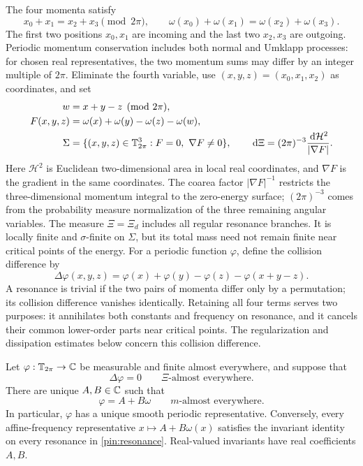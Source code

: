 The four momenta satisfy
\begin{equation}
 x_0+x_1=x_2+x_3\pmod{2\pi},\qquad
 \omega(x_0)+\omega(x_1)=\omega(x_2)+\omega(x_3).
 \label{pin:resonance}
\end{equation}
The first two positions $x_0,x_1$ are incoming and the last two
$x_2,x_3$ are outgoing. Periodic momentum conservation includes both
normal and Umklapp processes: for chosen real representatives, the two
momentum sums may differ by an integer multiple of $2\pi$.
Eliminate the fourth variable, use $(x,y,z)=(x_0,x_1,x_2)$ as coordinates,
and set
\begin{align}
 w&=x+y-z\pmod{2\pi},\notag\\
 F(x,y,z)&=\omega(x)+\omega(y)-\omega(z)-\omega(w),\notag\\
 \Sigma&=\{(x,y,z)\in\mathbb T_{2\pi}^3:F=0,\ \nabla F\ne0\},
 \qquad
 \,\mathrm d\Xi=(2\pi)^{-3}\frac{\,\mathrm d\mathcal H^2}{|\nabla F|}.
 \label{pin:measure}
\end{align}
Here $\mathcal H^2$ is Euclidean two-dimensional area in local real
coordinates, and $\nabla F$ is the gradient in the same coordinates.
The coarea factor $|\nabla F|^{-1}$ restricts the three-dimensional
momentum integral to the zero-energy surface; $(2\pi)^{-3}$ comes from
the probability measure normalization of the three remaining angular
variables. The measure $\Xi=\Xi_d$ includes all regular resonance
branches. It is locally finite and $\sigma$-finite on $\Sigma$, but its
total mass need not remain finite near critical points of the energy.
For a periodic function $\varphi$, define the collision difference by
\begin{equation}
 \Delta\varphi(x,y,z)
 =\varphi(x)+\varphi(y)-\varphi(z)-\varphi(x+y-z).
 \label{pin:difference}
\end{equation}
A resonance is trivial if the two pairs of momenta differ only by a
permutation; its collision difference vanishes identically. Retaining
all four terms serves two purposes: it annihilates both constants and
frequency on resonance, and it cancels their common lower-order parts
near critical points. The regularization and dissipation estimates
below concern this collision difference.

\begin{theorem}
\label{pin:classification}
Let $\varphi:\mathbb T_{2\pi}\to\mathbb C$ be measurable and finite almost
everywhere, and suppose that
\begin{equation}
                    \Delta\varphi=0\qquad\Xi\text{-almost everywhere}.
 \label{pin:invariance}
\end{equation}
There are unique $A,B\in\mathbb C$ such that
\begin{equation}
                      \varphi=A+B\omega\qquad m\text{-almost everywhere}.
 \label{pin:classified}
\end{equation}
In particular, $\varphi$ has a unique smooth periodic representative.
Conversely, every affine-frequency representative
$x\mapsto A+B\omega(x)$ satisfies the invariant identity on every
resonance in \eqref{pin:resonance}. Real-valued invariants have real
coefficients $A,B$.
\end{theorem}

